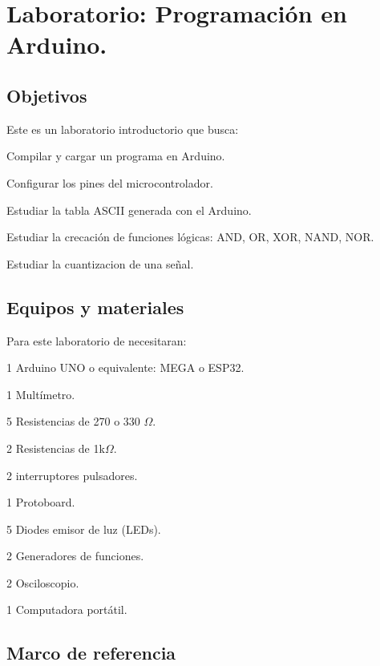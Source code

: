 \setcounter{page}{1}

\chapter{Laboratorio: Programación en Arduino.}


\section{Objetivos}
Este es un laboratorio introductorio que busca:
\begin{itemize}
	{\small \item Compilar y cargar  un programa en Arduino.
	\item Configurar los pines del microcontrolador.
	\item Estudiar la tabla ASCII generada con el Arduino.
	\item Estudiar la crecación de funciones lógicas: AND, OR, XOR, NAND, NOR.
	\item Estudiar la cuantizacion de una señal. }
\end{itemize} 


\section{Equipos y materiales}
Para este laboratorio de necesitaran:
\begin{itemize}
	{\small \item 1 Arduino UNO o equivalente: MEGA o ESP32.
	\item 1 Multímetro.
	\item 5 Resistencias de 270 o 330 $\Omega$.
	\item 2 Resistencias de 1k$\Omega$.
	\item 2 interruptores pulsadores.
	\item 1 Protoboard.
	\item 5 Diodes emisor de luz (LEDs).
	\item 2 Generadores de funciones.
	\item 2 Osciloscopio.
	\item 1 Computadora portátil.}
\end{itemize}

\section{Marco de referencia}

